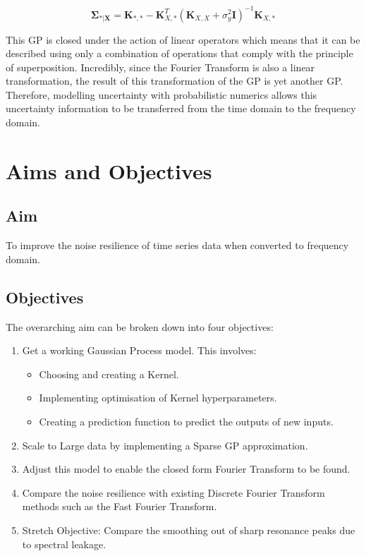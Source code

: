\documentclass[12pt]{article}
\begin{document}
    \begin{equation}
        \boldsymbol{\Sigma}_{*\vert \mathbf{X}} = \mathbf{K}_{*,*} - \mathbf{K}_{X,*}^T (\mathbf{K}_{X,X} + \sigma^2_y \mathbf{I})^{-1} \mathbf{K}_{X,*}\label{eq:18.53}
    \end{equation}


    This GP is closed under the action of linear operators which means that it can be described using only a combination of operations that comply with the principle of superposition.
    Incredibly, since the Fourier Transform is also a linear transformation, the result of this transformation of the GP is yet another GP\@.
    Therefore, modelling uncertainty with probabilistic numerics allows this uncertainty information to be transferred from the time domain to the frequency domain.


    \section{Aims and Objectives}
    \subsection{Aim}
    To improve the noise resilience of time series data when converted to frequency domain.

    \subsection{Objectives}
    The overarching aim can be broken down into four objectives:
        \begin{enumerate}
            \item Get a working Gaussian Process model.
            This involves:
                \begin{itemize}
                    \item Choosing and creating a Kernel.
                    \item Implementing optimisation of Kernel hyperparameters. \label{item:nll}
                    \item Creating a prediction function to predict the outputs of new inputs. \label{item:predict}
                \end{itemize}
            \item Scale to Large data by implementing a Sparse GP approximation.
            \item Adjust this model to enable the closed form Fourier Transform to be found.
            \item Compare the noise resilience with existing Discrete Fourier Transform methods such as the Fast Fourier Transform.\label{noise-resiliance}
            \item Stretch Objective: Compare the smoothing out of sharp resonance peaks due to spectral leakage.\label{stretch-obj}
        \end{enumerate}
\end{document}
